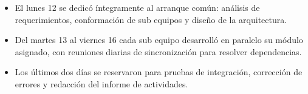 \vspace{0.4cm}

\begin{itemize}
  \item El lunes 12 se dedicó íntegramente al arranque común: análisis de requerimientos,
        conformación de sub equipos y diseño de la arquitectura.
  \item Del martes 13 al viernes 16 cada sub equipo desarrolló en paralelo su módulo
        asignado, con reuniones diarias de sincronización para resolver dependencias.
  \item Los últimos dos días se reservaron para pruebas de integración, corrección de
        errores y redacción del informe de actividades.
\end{itemize}
